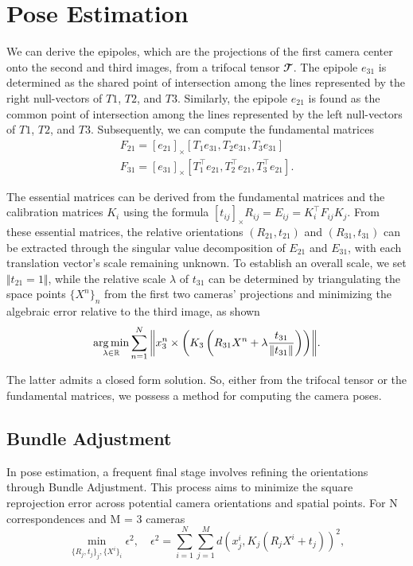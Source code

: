 \section{Pose Estimation}\label{sec:estimation}
We can derive the epipoles, which are the projections of the first camera center onto the second and third images, from a trifocal tensor \( \mathbfcal{T} \). The epipole \( e_{31} \) is determined as the shared point of intersection among the lines represented by the right null-vectors of \( T1 \), \( T2 \), and \( T3 \). Similarly, the epipole \( e_{21} \) is found as the common point of intersection among the lines represented by the left null-vectors of \( T1 \), \( T2 \), and \( T3 \). Subsequently, we can compute the fundamental matrices
\begin{equation}
	\begin{gathered}
		F_{21} = [e_{21}]_{\times}[T_1e_{31}, T_2e_{31}, T_3e_{31}]\\
		F_{31} = [e_{31}]_{\times}[T_1^\top e_{21}, T_2^\top e_{21}, T_3^\top e_{21}].
	\end{gathered}
\end{equation}

The essential matrices can be derived from the fundamental matrices and the calibration matrices \( K_i \) using the formula \( [t_{ij}]_{\times}R_{ij} = E_{ij} = K_i^\top F_{ij}K_j \). From these essential matrices, the relative orientations \( (R_{21}, t_{21}) \) and \( (R_{31}, t_{31}) \) can be extracted through the singular value decomposition of \( E_{21} \) and \( E_{31} \), with each translation vector's scale remaining unknown. To establish an overall scale, we set \( \Vert t_{21} = 1 \Vert \), while the relative scale \( \lambda \) of \( t_{31} \) can be determined by triangulating the space points \( \{X^n\}_n \) from the first two cameras' projections and minimizing the algebraic error relative to the third image, as shown
\begin{equation}
	\operatorname*{arg\,min}_{\lambda \in \mathbb{R}}{\sum_{n = 1}^{N}{\left\Vert x_3^n \times \left( K_3 \left( R_{31}X^n + \lambda \frac{t_{31}}{\Vert t_{31} \Vert} \right) \right) \right\Vert}}.
\end{equation}

The latter admits a closed form solution. So, either from the trifocal tensor or the fundamental matrices, we possess a method for computing the camera poses.

\subsection{Bundle Adjustment}
In pose estimation, a frequent final stage involves refining the orientations through Bundle Adjustment. This process aims to minimize the square reprojection error across potential camera orientations and spatial points. For N correspondences and M = 3 cameras
\begin{equation}
	\min_{\{ R_j, t_j \}_j, \{ X^i \}_i}{\epsilon^2}, \quad \epsilon^2 = \sum_{i = 1}^{N}{\sum_{j = 1}^{M}{d \left( x_j^i, K_j(R_jX^i + t_j) \right)^2}},
\end{equation}

